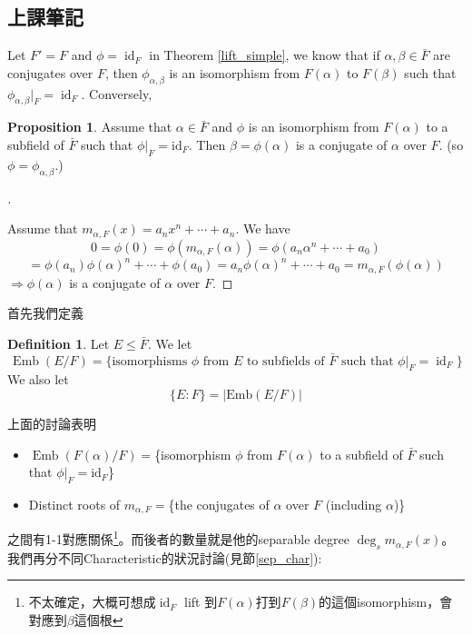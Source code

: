 \documentclass[12pt]{article}
\theoremstyle{definition}
\newtheorem{dfn}{Definition}
\newtheorem{prop}{Proposition}
\newenvironment{proofs}[1][\proofname]{%
  \begin{proof}[#1]$ $\par\nobreak\ignorespaces
}{%
  \end{proof}
}
\DeclareMathOperator{\id}{id}
\DeclareMathOperator{\Emb}{Emb}
\begin{document}
\subsection{上課筆記}

Let $F'=F$ and $\phi=\id_F$ in Theorem \ref{lift_simple}, we know that if $\alpha,\beta\in \bar{F}$ are conjugates over $F$, then $\phi_{\alpha,\beta}$ is an isomorphism from $F(\alpha)$ to $F(\beta)$ such that $\phi_{\alpha,\beta}|_F=\id_F$.
Conversely,

\begin{prop}
	Assume that $\alpha \in \bar{F}$ and $\phi$ is an isomorphism from $F(\alpha)$ to a subfield of $\bar{F}$ such that $\phi|_F = \text{id}_F$.
	Then $\beta=\phi(\alpha)$ is a conjugate of $\alpha$ over $F$. (so $\phi = \phi_{\alpha, \beta}$.)
\end{prop}

\begin{proofs}
	Assume that $m_{\alpha, F}(x) = a_n x^n + \cdots + a_n$.
	We have
	\[
		0 = \phi(0) = \phi(m_{\alpha, F}(\alpha)) = \phi(a_n \alpha^n + \cdots + a_0)
	\]
	\[
		= \phi(a_n) \phi(\alpha)^n + \cdots + \phi(a_0) = a_n \phi(\alpha)^n + \cdots + a_0 = m_{\alpha, F}(\phi(\alpha))
	\]
	$\Rightarrow \phi(\alpha)$ is a conjugate of $\alpha$ over $F$.

\end{proofs}

首先我們定義
\begin{dfn}
	Let $E \leq \bar{F}$. We let
	\[
		\Emb(E/F) =\{
		\text{isomorphisms $\phi$ from $E$ to subfields of $\bar{F}$ such that $\phi|_F = \id_F$}
		\}
	\]
	We also let
	\[\{E:F\} = |\text{Emb}(E/F)|\]
\end{dfn}


上面的討論表明
\begin{itemize}
	\item $\Emb(F(\alpha)/F)=$\{isomorphism $\phi$ from $F(\alpha)$ to a subfield of $\bar{F}$ such that $\phi|_F = \text{id}_F$\}
	\item Distinct roots of $m_{\alpha,F}=$\{the conjugates of $\alpha$ over $F$ (including $\alpha$)\}
\end{itemize}
之間有1-1對應關係\footnote{不太確定，大概可想成$\id_F$ lift 到$F(\alpha)$打到$F(\beta)$的這個isomorphism，會對應到$\beta$這個根}。而後者的數量就是他的separable degree $\deg_s m_{\alpha, F}(x)$。我們再分不同Characteristic的狀況討論(見節\ref{sep_char}):
\end{document}
